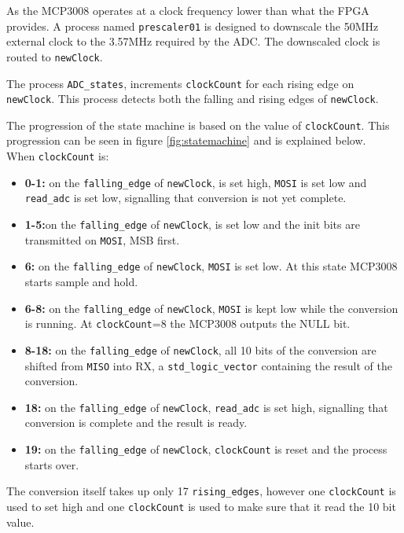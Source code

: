As the MCP3008 operates at a clock frequency lower than what the FPGA provides. 
A process named \texttt{prescaler01} is designed to downscale the 50MHz external clock to the 3.57MHz required by the ADC. 
The downscaled clock is routed to \texttt{newClock}.


The process \texttt{ADC\_states}, increments \texttt{clockCount} for each rising edge on \texttt{newClock}.
This process detects both the falling and rising edges of \texttt{newClock}.

The progression of the state machine is based on the value of \texttt{clockCount}. 
This progression can be seen in figure \ref{fig:statemachine} and is explained below.\\

When \texttt{clockCount} is:
\begin{itemize}
	\item \textbf{0-1:} on the \texttt{falling\_edge} of \texttt{newClock}, \cs is set high, \texttt{MOSI} is set low and \texttt{read\_adc} is set low, signalling that conversion is not yet complete.\\
	\item \textbf{1-5:}on the \texttt{falling\_edge} of \texttt{newClock}, \cs is set low and the init bits are transmitted on \texttt{MOSI}, MSB first.
	\item \textbf{6:} on the \texttt{falling\_edge} of \texttt{newClock}, \texttt{MOSI} is set low. At this state MCP3008 starts sample and hold.
	\item \textbf{6-8:} on the \texttt{falling\_edge} of \texttt{newClock}, \texttt{MOSI} is kept low while the conversion is running. At \texttt{clockCount}=8 the MCP3008 outputs the NULL bit.
	\item \textbf{8-18:} on the \texttt{falling\_edge} of \texttt{newClock}, all 10 bits of the conversion are shifted from \texttt{MISO} into RX, a \texttt{std\_logic\_vector} containing the result of the conversion.
	\item \textbf{18:} on the \texttt{falling\_edge} of \texttt{newClock}, \texttt{read\_adc} is set high, signalling that conversion is complete and the result is ready.
	\item \textbf{19:} on the \texttt{falling\_edge} of \texttt{newClock}, \texttt{clockCount} is reset and the process starts over.
\end{itemize}

The conversion itself takes up only 17 \texttt{rising\_edges}, however one \texttt{clockCount} is used to set \cs high  and one \texttt{clockCount} is used to make sure that it read the 10 bit value. 


